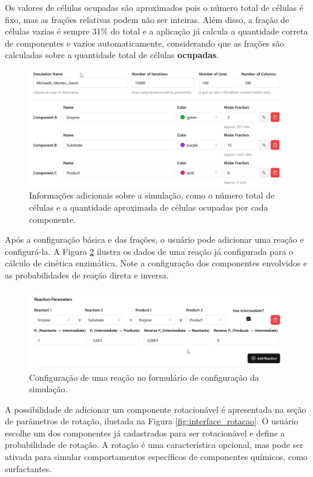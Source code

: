 \documentclass[12pt,oneside]{report}
\begin{document}
Os valores de células ocupadas são aproximados pois o número total de células é fixo, mas as frações relativas podem não ser inteiras. Além disso, a fração de células vazias é sempre 31\% do total e a aplicação já calcula a quantidade correta de componentes e vazios automaticamente, considerando que as frações são calculadas sobre a quantidade total de células \textbf{ocupadas}.

\begin{figure}[H]
    \centering
    \includegraphics[width=1\textwidth]{img/calculo_celulas.png}
    \caption{\small Informações adicionais sobre a simulação, como o número total de células e a quantidade aproximada de células ocupadas por cada componente.}
    \label{fig:informacoes}
\end{figure}

Após a configuração básica e das frações, o usuário pode adicionar uma reação e configurá-la. A Figura \ref{fig:interface_reacao} ilustra os dados de uma reação já configurada para o cálculo de cinética enzimática. Note a configuração dos componentes envolvidos e as probabilidades de reação direta e inversa.

\begin{figure}[H]
    \centering
    \includegraphics[width=1\textwidth]{img/reacao_config.png}
    \caption{\small Configuração de uma reação no formulário de configuração da simulação.}
    \label{fig:interface_reacao}
\end{figure}

A possibilidade de adicionar um componente rotacionável é apresentada na seção de parâmetros de rotação, ilustada na Figura \ref{fig:interface_rotacao}. O usuário escolhe um dos componentes já cadastrados para ser rotacionável e define a probabilidade de rotação. A rotação é uma característica opcional, mas pode ser ativada para simular comportamentos específicos de componentes químicos, como surfactantes.
\end{document}
